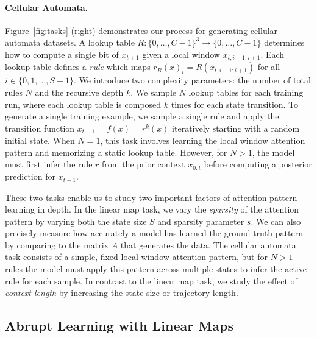 \documentclass{article}
\begin{document}
\paragraph{Cellular Automata.} Figure~\ref{fig:tasks} (right) demonstrates our process for generating cellular automata datasets. A lookup table $R:\{0,\dots, C-1\}^3\to\{0,\dots, C-1\}$ determines how to compute a single bit of $x_{t+1}$ given a local window $x_{t, i-1:i+1}$. Each lookup table defines a \textit{rule} which maps $r_R(x)_i=R(x_{t, i-1:i+1})$ for all $i\in\{0, 1,\dots, S-1\}$. We introduce two complexity parameters: the number of total rules $N$ and the recursive depth $k$. We sample $N$ lookup tables for each training run, where each lookup table is composed $k$ times for each state transition. To generate a single training example, we sample a single rule and apply the transition function $x_{t+1}=f(x)=r^k(x)$ iteratively starting with a random initial state. When $N=1$, this task involves learning the local window attention pattern and memorizing a static lookup table. However, for $N>1$, the model must first infer the rule $r$ from the prior context $x_{0:t}$ before computing a posterior prediction for $x_{t+1}$.

These two tasks enable us to study two important factors of attention pattern learning in depth. In the linear map task, we vary the \textit{sparsity} of the attention pattern by varying both the state size $S$ and sparsity parameter $s$. We can also precisely measure how accurately a model has learned the ground-truth pattern by comparing to the matrix $A$ that generates the data. The cellular automata task consists of a simple, fixed local window attention pattern, but for $N>1$ rules the model must apply this pattern across multiple states to infer the active rule for each sample. In contrast to the linear map task, we study the effect of \textit{context length} by increasing the state size or trajectory length.

\subsection{Abrupt Learning with Linear Maps}
\label{sec:abrupt}
\end{document}

